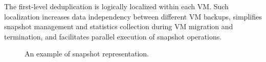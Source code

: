 The first-level deduplication is logically localized within each VM.
Such localization increases data independency between different  VM backups,
simplifies  snapshot  management and statistics collection during VM migration and termination,
and facilitates parallel execution of snapshot operations.

\begin{figure}[htbp]
  \centering
  \caption{An example of snapshot representation.}
  \label{fig:snapshot}
\end{figure}



